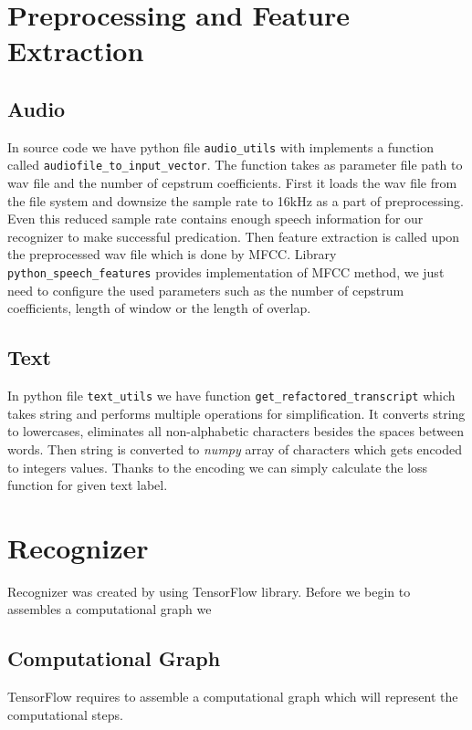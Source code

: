 \section{Preprocessing and Feature Extraction}


\subsection{Audio}

In source code we have python file \texttt{audio\_utils} with implements a function called \texttt{audiofile\_to\_input\_vector}.
The function takes as parameter file path to wav file and the number of cepstrum coefficients.
First it loads the wav file from the file system and downsize the sample rate to 16kHz as a part of preprocessing.
Even this reduced sample rate contains enough speech information for our recognizer to make successful predication.
Then feature extraction is called upon the preprocessed wav file which is done by MFCC.
Library \texttt{python\_speech\_features} provides implementation of MFCC method, we just need to configure the used parameters such as the number of cepstrum coefficients, length of window or the length of overlap.

\subsection{Text}

In python file \texttt{text\_utils} we have function \texttt{get\_refactored\_transcript} which takes string and performs multiple operations for simplification.
It converts string to lowercases, eliminates all non-alphabetic characters besides the spaces between words.
Then string is converted to \textit{numpy} array of characters which gets encoded to integers values.
Thanks to the encoding we can simply calculate the loss function for given text label.


\section{Recognizer}

Recognizer was created by using TensorFlow library. Before we begin to assembles a computational graph we

\subsection{Computational Graph}

TensorFlow requires to assemble a computational graph which will represent the computational steps.

